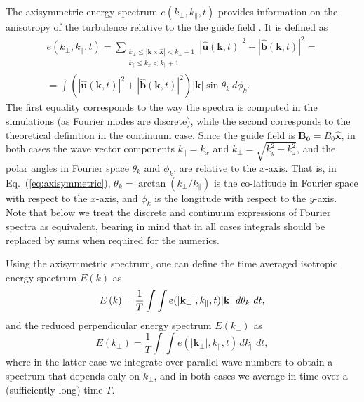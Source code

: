 \documentclass[aip,pop,reprint,amsmath,amssymb,floatfix]{revtex4-1}
\let\oldhat\hat
\renewcommand{\vec}[1]{\mathbf{#1}}
\renewcommand{\hat}[1]{\oldhat{\mathbf{#1}}}
\begin{document}
The axisymmetric energy spectrum $e(k_\perp, k_\parallel, t)$ provides
information on the anisotropy of the turbulence relative to the the
guide field \cite{mininni_isotropization_2012}. It is defined as
\begin{equation}\label{eq:axisymmetric}
\begin{split}  e(k_\perp, k_\parallel, t) = \sum_{\substack{k_\perp \leq |\vec{k}\times\hat{x}| < k_\perp+1 \\ k_\parallel \leq k_x < k_\parallel +1}} |\hat{u}(\vec{k},t)|^2 +|\hat{b}(\vec{k},t)|^2 = \\ = \int \left(|\hat{u}(\vec{k},t)|^2 +|\hat{b}(\vec{k},t)|^2\right) |\vec{k}| \sin \theta_k~d\phi_k.
\end{split}
\end{equation}
The first equality corresponds to the way the spectra is computed 
in the simulations (as Fourier modes are discrete), while the 
second corresponds to the theoretical definition in the continuum 
case. Since the guide field is $\vec{B_0} = B_0 \hat{x}$, in both 
cases the wave vector components $k_\parallel = k_x$ and 
$k_\perp = \sqrt{k_y^2+k_z^2}$, and the polar angles in Fourier 
space $\theta_k$ and $\phi_k$, are relative to the $x$-axis. That is, 
in Eq.~(\ref{eq:axisymmetric}), 
$\theta_k = \arctan(k_\perp/k_\parallel)$ is the co-latitude in
Fourier space with respect to the $x$-axis, and $\phi_k$ is the
longitude with respect to the $y$-axis. Note that below we treat the 
discrete and continuum expressions of Fourier spectra as equivalent,
bearing in mind that in all cases integrals should be replaced by sums
when required for the numerics.

Using the axisymmetric spectrum, one can define the time averaged
isotropic energy spectrum $E(k)$ as
\begin{equation}
  E\left(k \right) = \frac{1}{T}\int\int e(|\vec{k_\perp}|,
  k_\parallel, t) |{\bf k}|~d\theta_k~dt,
\end{equation}
and the reduced perpendicular energy spectrum $E(k_\perp)$
\cite{mininni_isotropization_2012} as
\begin{equation}\label{eq:reducedspectrum}
  E\left(k_\perp\right) = \frac{1}{T}\int\int e(|\vec{k_\perp}|,
  k_\parallel, t) \, dk_\parallel~dt,
\end{equation}
where in the latter case we integrate over parallel wave numbers to 
obtain a spectrum that depends only on $k_\perp$, and in both cases
we average in time over a (sufficiently long) time $T$.
\end{document}

